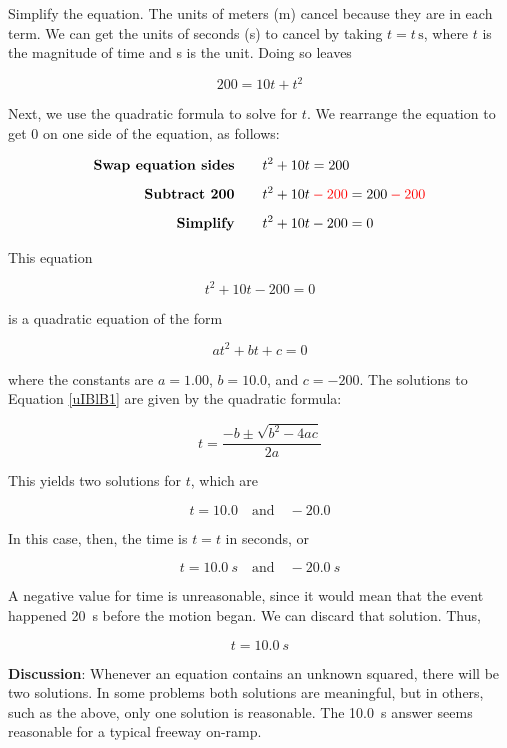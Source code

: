 \documentclass[dvipsnames]{article}
\begin{document}
Simplify the equation. The units of meters (m) cancel because they are in each term. We can get the units of seconds (s) to cancel by taking  $t = t\,\text{s}$, where $t$ is the magnitude of time and s is the unit. Doing so leaves

\begin{equation*}
    200 = 10t + t^2
\end{equation*}

Next, we use the quadratic formula to solve for $t$. We rearrange the equation to get 0 on one side of the equation, as follows:

\begin{align*}
    \textbf{Swap equation sides} \qquad & t^2 + 10t = 200\\[1ex]
    \textbf{Subtract 200} \qquad & t^2 + 10t \mathbin{\color{red} -} \textcolor{red}{200} = 200 \mathbin{\color{red} -} \textcolor{red}{200}\\[1ex]
    \textbf{Simplify} \qquad & t^2 + 10t - 200 = 0
\end{align*}

This equation

\begin{equation} \label{uIBlB1}
    t^2 + 10t - 200 = 0
\end{equation}

is a quadratic equation of the form

\begin{equation}
    a t^2 + bt + c = 0
\end{equation}

where the constants are $a = 1.00$, $b = 10.0$, and $c = -200$. The solutions to Equation \eqref{uIBlB1} are given by the quadratic formula:

\begin{equation}
    t = \frac{-b \pm \sqrt{b^2 - 4ac}}{2a}
\end{equation}

This yields two solutions for $t$, which are

\begin{equation*}
    t = 10.0 \quad \text{and} \quad -20.0
\end{equation*}

In this case, then, the time is $t = t$ in seconds, or

\begin{equation*}
     t = \SI{10.0}{s} \quad \text{and} \quad -\SI{20.0}{s}
\end{equation*}

A negative value for time is unreasonable, since it would mean that the event happened \SI{20}{s} before the motion began. We can discard that solution. Thus,

\begin{equation*}
    t = \SI{10.0}{s}
\end{equation*}

\textbf{Discussion}: Whenever an equation contains an unknown squared, there will be two solutions. In some problems both solutions are meaningful, but in others, such as the above, only one solution is reasonable. The \SI{10.0}{s} answer seems reasonable for a typical freeway on-ramp.

\endsolution
 
\end{document}

